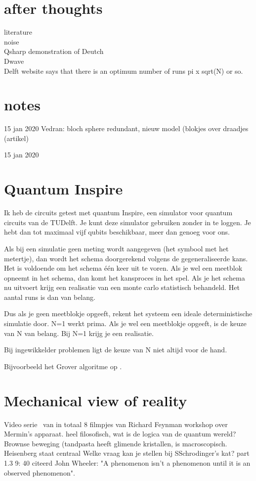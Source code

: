 \documentclass[../../main.tex]{subfiles}
\begin{document}
\section{after thoughts}
literature\\
noise\\
Qsharp demonstration of Deutch\\
Dwave\\
Delft website says that there is an optimum number of runs pi x sqrt(N) or so.\\

\section*{notes}

15 jan 2020 Vedran: bloch sphere redundant, nieuw model (blokjes over draadjes (artikel)


15 jan 2020 


\section{Quantum Inspire}
Ik heb de circuits getest met quantum Inspire, een simulator voor quantum circuits van de TUDelft. Je kunt deze simulator gebruiken zonder in te loggen. Je hebt dan tot maximaal vijf qubits beschikbaar, meer dan genoeg voor ons.

Als bij een simulatie geen meting wordt aangegeven (het symbool met het metertje), dan wordt het schema doorgerekend volgens de gegeneraliseerde kans. Het is voldoende om het schema \'e\'en keer uit te voren.
Als je wel een meetblok opneemt in het schema, dan komt het kansproces in het spel.
Als je het schema nu uitvoert krijg een realisatie van een monte carlo statistisch behandeld. Het aantal runs is dan van belang.

Dus als je geen meetblokje opgeeft, rekent het systeem een ideale deterministische simulatie door. N=1 werkt prima. Als je wel een meetblokje opgeeft, is de keuze van N van belang. Bij N=1 krijg je een realisatie. 

Bij ingewikkelder problemen ligt de keuze van N niet altijd voor de hand. 

Bijvoorbeeld het Grover algoritme op . 
 

\section{Mechanical view of reality}
Video serie~\cite{feynman1983quantum} van in totaal 8 filmpjes van Richard Feynman workshop over Mermin's apparaat.
heel filosofisch, wat is de logica van de quantum wereld? Brownse beweging (tandpasta heeft glimende kristallen, is macroscopisch. Heisenberg staat centraal
Welke vraag kan je stellen bij SSchrodinger's kat?
part 1.3 9: 40 citeerd John Wheeler: "A phenomenon isn't a phenomenon until it is an observed phenomenon".
\end{document}
